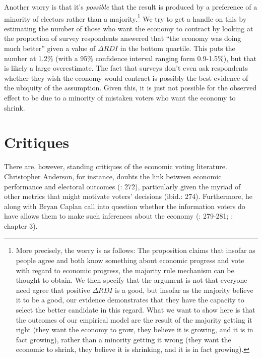 \documentclass[11pt]{article}
\begin{document}
Another worry is that it's \emph{possible} that the result is produced by a preference of a minority of electors rather than a majority.\footnote{More precisely, the worry is as follows: The proposition claims that insofar as people agree and both know something about economic progress and vote with regard to economic progress, the majority rule mechanism can be thought to obtain. We then specify that the argument is not that everyone need agree that positive $\Delta RDI$ is a good, but insofar as the majority believe it to be a good, our evidence demonstrates that they have the capacity to select the better candidate in this regard. What we want to show here is that the outcomes of our empirical model are the result of the majority getting it right (they want the economy to grow,  they believe it is growing, and it is in fact growing), rather than a minority getting it wrong (they want the economic to shrink, they believe it is shrinking, and it is in fact growing).} We try to get a handle on this by estimating the number of those who want the economy to contract by looking at the proportion of survey respondents answered  that ``the economy was doing much better'' given a value of $\Delta RDI$ in the bottom quartile. This puts the number at 1.2\% (with a 95\% confidence interval ranging form 0.9-1.5\%), but that is likely a large overestimate. %
The fact that surveys don't even ask respondents whether they wish the economy would contract is possibly the best evidence of the ubiquity of the assumption. Given this, it is just not possible for the observed effect to be due to a minority of mistaken voters who want the economy to shrink.


\section{Critiques}

There are, however, standing critiques of the economic voting literature.  Christopher Anderson, for instance, doubts the link between economic performance and electoral outcomes (\cite{Anderson07}: 272), particularly given the myriad of other metrics that might motivate voters' decisions (ibid.: 274). Furthermore, he along with Bryan Caplan call into question whether the information voters do have allows them to make such inferences about the economy (\cite{Anderson07}: 279-281; \cite{Caplan2006}: chapter 3).
\end{document}
